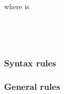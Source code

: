 \begin{syntax}
  \begin{0-1}
     \\
     \\
  \end{0-1}

  \begin{0-1}
     \\
  \end{0-1}
\end{syntax}

where  is

\begin{syntax}
  \begin{0-1}
    \begin{1=}
      \identifier \\
      \literal
    \end{1=} \\
  \end{0-1}

  \begin{0-1}
     \identifier
  \end{0-1}

  \begin{0-1}
     \identifier
  \end{0-1}
\end{syntax}

\subsubsection{Syntax rules}

\subsubsection{General rules}

